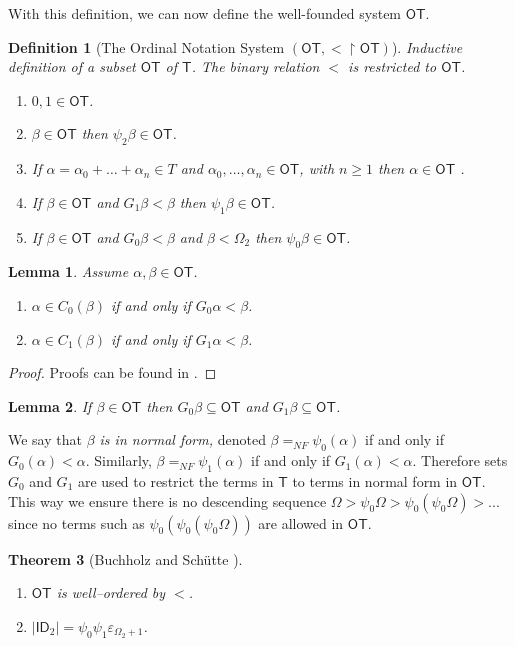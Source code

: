 \documentclass{amsart}
\theoremstyle{plain}
\theoremstyle{plain}
\newtheorem{theorem}{Theorem}
\newtheorem{lemma}[theorem]{Lemma}
\newtheorem*{definition}{Definition}
\newcommand\T{\mathsf{T}}
\newcommand\OT{\mathsf{OT}}
\newcommand{\ID}{\mathsf{ID}}
\newcommand{\Om}{{\Omega}}
\newcommand{\al}{{\alpha}}
\newcommand{\be}{{\beta}}
\begin{document}
With this definition, we can now define the well-founded system $\OT$.
\begin{definition}[The Ordinal Notation System $(\OT, <\restriction \OT)$]  Inductive definition of a subset $\OT$ of $\T$. The binary relation $<$ is restricted to $\OT$.
\begin{enumerate}
    \item $0,1\in \OT$.
    \item $\be \in \OT$ then $\psi_2\be \in \OT$.
    \item If $\al= \al_0+\ldots+\al_n \in T$ and $\al_0,\ldots,\al_n\in \OT$, with $n\geq 1$ then $\al \in \OT$ .
    \item If $\be \in \OT$ and  $G_1\be <\be$  then $\psi_1\be \in \OT$. 
    \item If $\be \in \OT$ and $G_0\be <\be$ and $\be < \Om_2$ then $\psi_0\be \in \OT$.
\end{enumerate}
\end{definition}

\begin{lemma}
Assume $\al,\be \in \OT$.
\begin{enumerate}
    \item 	$\al \in C_0(\be)$ if and only if $G_0\al <\be$.
    \item 	$\al \in C_1(\be)$ if and only if $G_1\al <\be$.
\end{enumerate}
\end{lemma}
\begin{proof}
Proofs can be found in \cite{BuchholzSchutte}.
\end{proof}

\begin{lemma}
If	$\be\in \OT$ then $G_0\be\subseteq \OT$ and $G_1\be\subseteq \OT$.
\end{lemma}
We say that {\em $\be$ is in normal form,} denoted $\be =_{NF} \psi_0(\al)$ if and only if $G_0(\al)<\al$.
Similarly, $\be =_{NF} \psi_1(\al)$ if and only if $G_1(\al)<\al$.  Therefore sets $G_0$ and $G_1$ are used to restrict the terms in $\T$ to terms in normal form in $\OT$. This way we ensure there is no descending sequence $\Om>\psi_0\Om>\psi_0(\psi_0\Om)>...$ since no terms such as $\psi_0(\psi_0(\psi_0\Om))$ are allowed in $\OT$.

\begin{theorem}[Buchholz and Sch\"utte \cite{BuchholzSchutte}]
$\;$
\begin{enumerate} 
    \item $\OT$ is well–ordered by $<$.
     \item  $|\ID_2| = \psi_0\psi_1\varepsilon_{\Omega_2+1}$.
\end{enumerate}
\end{theorem}
\end{document}
